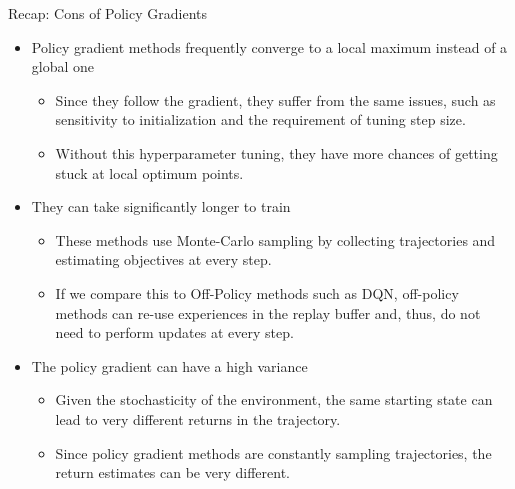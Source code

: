 \documentclass[aspectratio=169]{../latex_main/tntbeamer}  %
\begin{document}
\begin{frame}[c]{Recap: Cons of Policy Gradients}
	
\begin{itemize}
    \item Policy gradient methods frequently converge to a local maximum instead of a global one
    \begin{itemize}
        \item Since they follow the gradient, they suffer from the same issues, such as sensitivity to initialization and the requirement of tuning step size.
        \item Without this hyperparameter tuning, they have more chances of getting stuck at local optimum points.
    \end{itemize}
    \pause
    \item They can take significantly longer to train
    \begin{itemize}
        \item These methods use Monte-Carlo sampling by collecting trajectories and estimating objectives at every step. 
        \item If we compare this to Off-Policy methods such as DQN, off-policy methods can re-use experiences in the replay buffer and, thus, do not need to perform updates at every step.
    \end{itemize}
    \pause
    \item The policy gradient can have a high variance
    \begin{itemize}
        \item Given the stochasticity of the environment, the same starting state can lead to very different returns in the trajectory.
        \item Since policy gradient methods are constantly sampling trajectories, the return estimates can be very different.
    \end{itemize}
\end{itemize}

	
\end{frame}
\end{document}
